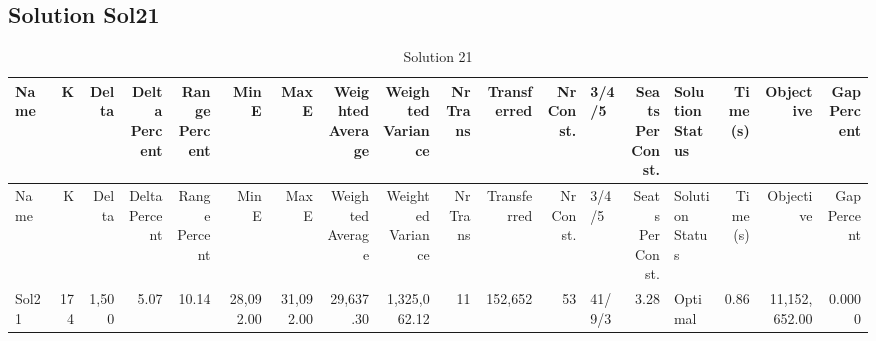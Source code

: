 \documentclass[a4paper]{article}
\begin{document}
\clearpage
\subsection{Solution Sol21}

{\scriptsize
\begin{longtable}{lrrrrrrrrrrrlrlrrr}
\caption{Solution 21}
\\ \toprule
Name &K &Delta &\shortstack{Delta\\Percent} &\shortstack{Range\\Percent} &Min E &Max E &\shortstack{Weighted\\Average} &\shortstack{Weighted\\Variance} &\shortstack{Nr\\Trans} &Transferred &\shortstack{Nr\\Const.} &3/4/5 &\shortstack{Seats\\Per\\Const.} &\shortstack{Solution\\Status} &\shortstack{Time\\(s)} &Objective &\shortstack{Gap\\Percent} \\ \midrule
\endfirsthead
\toprule
Name &K &Delta &\shortstack{Delta\\Percent} &\shortstack{Range\\Percent} &Min E &Max E &\shortstack{Weighted\\Average} &\shortstack{Weighted\\Variance} &\shortstack{Nr\\Trans} &Transferred &\shortstack{Nr\\Const.} &3/4/5 &\shortstack{Seats\\Per\\Const.} &\shortstack{Solution\\Status} &\shortstack{Time\\(s)} &Objective &\shortstack{Gap\\Percent} \\ \midrule
\endhead
\bottomrule
\endfoot
Sol21&174&1,500& 5.07&10.14&28,092.00&31,092.00&29,637.30&1,325,062.12&11&152,652&53&41/9/3& 3.28&Optimal& 0.86&11,152,652.00&0.0000\\ 
\end{longtable}

}
\end{document}
